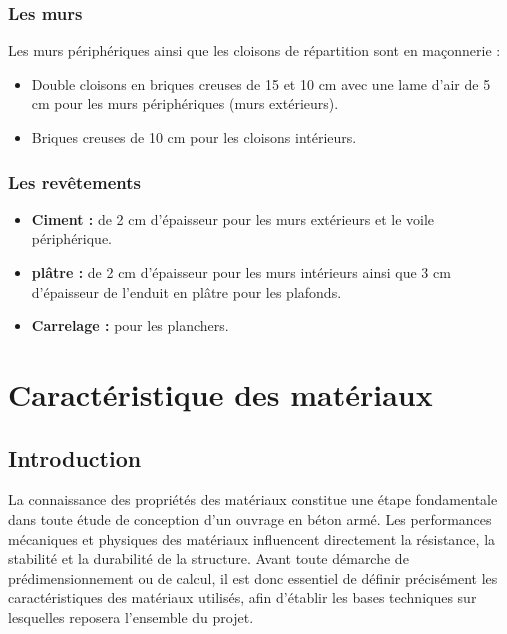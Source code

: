 \documentclass[12pt,a4paper]{report}
\numberwithin{equation}{section}
\begin{document}
	\subsubsection{Les murs}
	
	Les murs périphériques ainsi que les cloisons de répartition sont en maçonnerie :
	
	\begin{itemize}
		\item Double cloisons en briques creuses de 15 et 10 cm avec une lame d'air de 5 cm pour les murs périphériques (murs extérieurs).
		
		\item Briques creuses de 10 cm pour les cloisons intérieurs.
	\end{itemize}
	
	
	\subsubsection{Les revêtements}
	
	\begin{itemize}
		\item \textbf{Ciment :} de 2 cm d’épaisseur pour les murs extérieurs et le voile périphérique.
		
		\item \textbf{plâtre :} de 2 cm d’épaisseur pour les murs intérieurs ainsi que 3 cm d’épaisseur de l’enduit en plâtre pour les plafonds.
		
		\item \textbf{Carrelage :} pour les planchers.
	\end{itemize}
	
	
	
	\section{Caractéristique des matériaux}
	
	\subsection{Introduction}
	
	La connaissance des propriétés des matériaux constitue une étape fondamentale dans toute étude de conception d’un ouvrage en béton armé. Les performances mécaniques et physiques des matériaux influencent directement la résistance, la stabilité et la durabilité de la structure. Avant toute démarche de prédimensionnement ou de calcul, il est donc essentiel de définir précisément les caractéristiques des matériaux utilisés, afin d’établir les bases techniques sur lesquelles reposera l’ensemble du projet.
	
\end{document}

